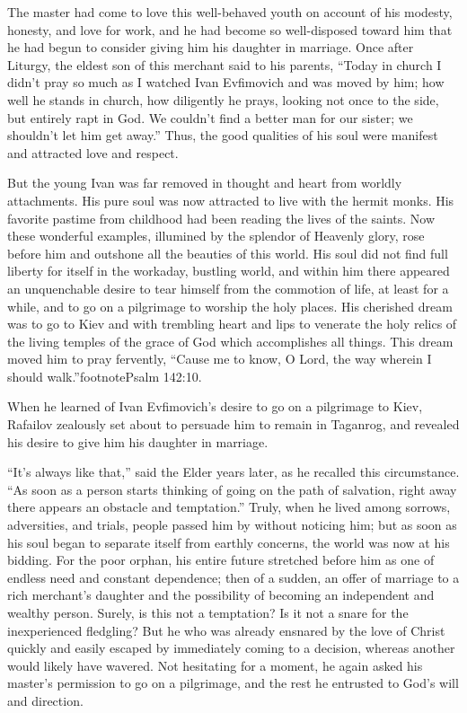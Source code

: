 The master had come to love this well-behaved youth on account of his modesty, honesty, and love for work, and he had become so well-disposed toward him that he had begun to consider giving him his daughter in marriage. Once after Liturgy, the eldest son of this merchant said to his parents, ``Today in church I didn't pray so much as I watched Ivan Evfimovich and was moved by him; how well he stands in church, how diligently he prays, looking not once to the side, but entirely rapt in God. We couldn't find a better man for our sister; we shouldn't let him get away.'' Thus, the good qualities of his soul were manifest and attracted love and respect.

But the young Ivan was far removed in thought and heart from worldly attachments. His pure soul was now attracted to live with the hermit monks. His favorite pastime from childhood had been reading the lives of the saints. Now these wonderful examples, illumined by the splendor of Heavenly glory, rose before him and outshone all the beauties of this world. His soul did not find full liberty for itself in the workaday, bustling world, and within him there appeared an unquenchable desire to tear himself from the commotion of life, at least for a while, and to go on a pilgrimage to worship the holy places. His cherished dream was to go to Kiev and with trembling heart and lips to venerate the holy relics of the living temples of the grace of God which accomplishes all things. This dream moved him to pray fervently, ``Cause me to know, O Lord, the way wherein I should walk.''footnote{Psalm 142:10.}

When he learned of Ivan Evfimovich's desire to go on a pilgrimage to Kiev, Rafailov zealously set about to persuade him to remain in Taganrog, and revealed his desire to give him his daughter in marriage.

``It's always like that,'' said the Elder years later, as he recalled this circumstance. ``As soon as a person starts thinking of going on the path of salvation, right away there appears an obstacle and temptation.'' Truly, when he lived among sorrows, adversities, and trials, people passed him by without noticing him; but as soon as his soul began to separate itself from earthly concerns, the world was now at his bidding. For the poor orphan, his entire future stretched before him as one of endless need and constant dependence; then of a sudden, an offer of marriage to a rich merchant's daughter and the possibility of becoming an independent and wealthy person. Surely, is this not a temptation? Is it not a snare for the inexperienced fledgling? But he who was already ensnared by the love of Christ quickly and easily escaped by immediately coming to a decision, whereas another would likely have wavered. Not hesitating for a moment, he again asked his master's permission to go on a pilgrimage, and the rest he entrusted to God's will and direction.

